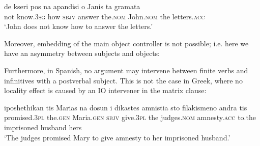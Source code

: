 \documentclass[output=paper]{langsci/langscibook}
\begin{document}
\ea%
    \label{ex:alexiadou:21}
    \gll de kseri          pos na apandisi     o Janis   ta gramata    \\
          not know{}.\textsc{3sg} how \textsc{sbjv} answer   the.\textsc{nom} John{}.\textsc{nom}   the letters{}.\textsc{acc}\\
    \glt  ‘John does not know how to answer the letters.’
    \z

Moreover, embedding of the main object controller is not possible; i.e. here we have an asymmetry between subjects and objects:

\ea%
    \label{ex:alexiadou:22}
    \z
\z   


Furthermore, in Spanish, no argument may intervene between finite verbs and infinitives with a postverbal subject. This is not the case in Greek, where no locality effect is caused by an IO intervener in the matrix clause:

\begin{exe}%
\end{exe}

  

\ea%
    \label{ex:alexiadou:24}
    \gll iposhethikan     tis Marias  na  dosun       i dikastes     amnistia   sto filakismeno      andra     tis\\
         promised.\textsc{3pl}    the.\textsc{gen} Maria.\textsc{gen} \textsc{sbjv} give.\textsc{3pl} the judges.\textsc{nom}   amnesty.\textsc{acc} to.the imprisoned husband hers\\
    \glt   ‘The judges promised Mary to give amnesty to her imprisoned husband.’
    \z
\end{document}

